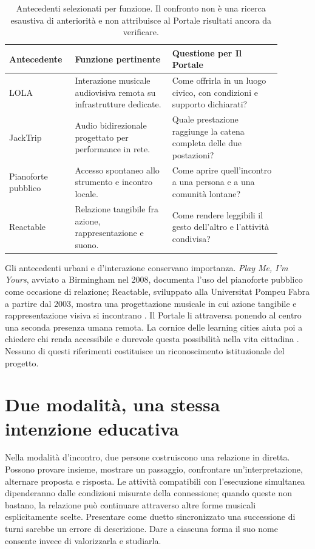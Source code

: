 \begin{table}[htbp]
\centering\small
\begin{tabular}{p{0.19\linewidth}p{0.33\linewidth}p{0.37\linewidth}}
\hline
\textbf{Antecedente} & \textbf{Funzione pertinente} & \textbf{Questione per Il Portale} \\
\hline
LOLA & Interazione musicale audiovisiva remota su infrastrutture dedicate. & Come offrirla in un luogo civico, con condizioni e supporto dichiarati? \\
JackTrip & Audio bidirezionale progettato per performance in rete. & Quale prestazione raggiunge la catena completa delle due postazioni? \\
Pianoforte pubblico & Accesso spontaneo allo strumento e incontro locale. & Come aprire quell'incontro a una persona e a una comunità lontane? \\
Reactable & Relazione tangibile fra azione, rappresentazione e suono. & Come rendere leggibili il gesto dell'altro e l'attività condivisa? \\
\hline
\end{tabular}
\caption{Antecedenti selezionati per funzione. Il confronto non è una ricerca esaustiva di anteriorità e non attribuisce al Portale risultati ancora da verificare.}
\label{tab:antecedents}
\end{table}

Gli antecedenti urbani e d'interazione conservano importanza. \emph{Play Me, I'm Yours}, avviato a Birmingham nel 2008, documenta l'uso del pianoforte pubblico come occasione di relazione; Reactable, sviluppato alla Universitat Pompeu Fabra a partire dal 2003, mostra una progettazione musicale in cui azione tangibile e rappresentazione visiva si incontrano \cite{conc_streetpianos,conc_reactable}. Il Portale li attraversa ponendo al centro una seconda presenza umana remota. La cornice delle learning cities aiuta poi a chiedere chi renda accessibile e durevole questa possibilità nella vita cittadina \cite{conc_learningcity}. Nessuno di questi riferimenti costituisce un riconoscimento istituzionale del progetto.

\section{Due modalità, una stessa intenzione educativa}

Nella modalità d'incontro, due persone costruiscono una relazione in diretta. Possono provare insieme, mostrare un passaggio, confrontare un'interpretazione, alternare proposta e risposta. Le attività compatibili con l'esecuzione simultanea dipenderanno dalle condizioni misurate della connessione; quando queste non bastano, la relazione può continuare attraverso altre forme musicali esplicitamente scelte. Presentare come duetto sincronizzato una successione di turni sarebbe un errore di descrizione. Dare a ciascuna forma il suo nome consente invece di valorizzarla e studiarla.

